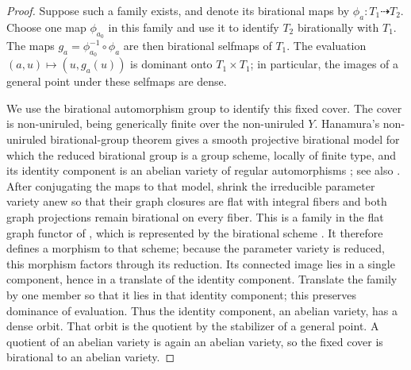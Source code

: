 \begin{proof}
Suppose such a family exists, and denote its birational maps by
\(\phi_a:T_1\dashrightarrow T_2\).
Choose one map \(\phi_{a_0}\) in this family and use it to identify
\(T_2\) birationally with \(T_1\). The maps
\(g_a=\phi_{a_0}^{-1}\circ\phi_a\) are then birational selfmaps of
\(T_1\). The evaluation \((a,u)\mapsto(u,g_a(u))\) is dominant onto
\(T_1\times T_1\); in particular, the images of a general point under
these selfmaps are dense.

We use the birational automorphism group to identify this fixed cover.
The cover is non-uniruled, being generically finite over the
non-uniruled \(Y\).  Hanamura's non-uniruled birational-group
theorem gives a smooth projective birational model for which the
reduced birational group is a group scheme, locally of finite type,
and its identity component is an abelian variety of regular automorphisms
\cite[Theorems~2.1--2.2]{Hanamura1988};
see also \cite[Proposition~3.7 and Theorems~3.8--3.9]{Blanc2017}.
After conjugating the maps to that model, shrink the irreducible
parameter variety anew so that their graph closures are flat
with integral fibers and both graph projections remain birational on
every fiber. This is a family in the flat graph functor of
\cite[Definition~3.4]{Blanc2017}, which is represented by the
birational scheme \cite[Proposition~3.7]{Blanc2017}. It therefore
defines a morphism to that scheme;
because the parameter variety is reduced, this morphism factors
through its reduction. Its connected image lies in a single component,
hence in a translate of the identity component. Translate the family
by one member so that it lies in that identity component; this
preserves dominance of evaluation. Thus the identity component, an
abelian variety, has a dense orbit. That orbit is the quotient by the
stabilizer of a general point. A quotient of an abelian variety is
again an abelian variety, so the fixed cover is birational to an
abelian variety.


\end{proof}
